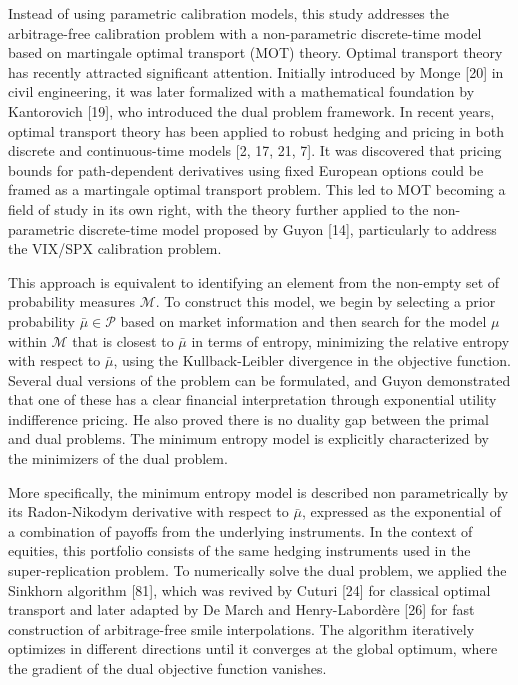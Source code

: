 \vspace{.1in}
Instead of using parametric calibration models, this study addresses the arbitrage-free calibration problem with a 
non-parametric discrete-time model based on martingale optimal transport (MOT) theory. Optimal transport theory has 
recently attracted significant attention. Initially introduced by Monge [20] in civil engineering, it was later formalized 
with a mathematical foundation by Kantorovich [19], who introduced the dual problem framework. In recent years, 
optimal transport theory has been applied to robust hedging and pricing in both discrete and continuous-time models 
[2, 17, 21, 7]. It was discovered that pricing bounds for path-dependent derivatives using fixed European options could 
be framed as a martingale optimal transport problem. This led to MOT becoming a field of study in its own right, 
with the theory further applied to the non-parametric discrete-time model proposed by Guyon [14], 
particularly to address the VIX/SPX calibration problem.

This approach is equivalent to identifying an element from the non-empty set of probability measures \(\mathcal{M}\). 
To construct this model, we begin by selecting a prior probability \(\bar{\mu} \in \mathcal{P}\) based on market information 
and then search for the model \(\mu\) within \(\mathcal{M}\) that is closest to \(\bar{\mu}\) in terms of entropy, minimizing 
the relative entropy with respect to \(\bar{\mu}\), using the Kullback-Leibler divergence in the objective function. 
Several dual versions of the problem can be formulated, and Guyon demonstrated that one of these has a clear financial 
interpretation through exponential utility indifference pricing. He also proved there is no duality gap between the primal 
and dual problems. The minimum entropy model is explicitly characterized by the minimizers of the dual problem.

More specifically, the minimum entropy model is described non parametrically by its Radon-Nikodym derivative with respect to 
\(\bar{\mu}\), expressed as the exponential of a combination of payoffs from the underlying instruments. In the context of 
equities, this portfolio consists of the same hedging instruments used in the super-replication problem. To numerically solve 
the dual problem, we applied the Sinkhorn algorithm [81], which was revived by Cuturi [24] for classical optimal transport 
and later adapted by De March and Henry-Labordère [26] for fast construction of arbitrage-free smile interpolations. 
The algorithm iteratively optimizes in different directions until it converges at the global optimum, where the gradient of 
the dual objective function vanishes.

